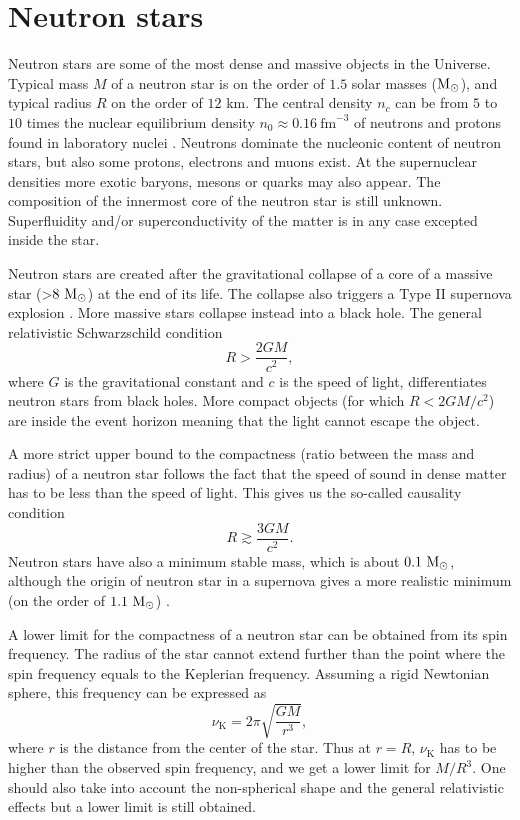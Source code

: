 \documentclass{wihuri}
\def\be{\begin{equation}}
\def\ee{\end{equation}}
\def\msun{{\rm M_{\odot}}}
\begin{document}
\section{Neutron stars}


Neutron stars are some of the most dense and massive objects in the
Universe. Typical mass $M$ of a neutron star is on the order of $1.5$ solar masses ($\msun$), %
and typical radius $R$ on the order of $12$ km. The central density $n_{c}$ can be from $5$ to $10$ times the nuclear equilibrium density $n_{0} \approx 0.16 ~\mathrm{fm}^{-3}$ of neutrons and protons found in laboratory nuclei \cite{lattimer}. Neutrons dominate the nucleonic content of neutron stars, but also some protons, electrons and muons exist. At the supernuclear densities more exotic baryons, mesons or quarks may also appear. The composition of the innermost core of the neutron star is still unknown. Superfluidity and/or superconductivity of the matter %
is in any case excepted inside the star. 

 
Neutron stars are created after the gravitational collapse of a core of a
massive star (>$8~\msun$) at the end of its life. The collapse also triggers a Type II supernova explosion \cite{lattimer}. More massive stars collapse instead into a black hole. The general relativistic Schwarzschild condition 
\be \label{eq:schw_cond}
 R > \frac{2GM}{c^{2}},
\ee 
where $G$ is the gravitational constant and $c$ is the speed of light, %
differentiates neutron stars from black holes. More compact objects (for which $R < 2GM/c^{2}$) are inside the event horizon meaning that the light cannot escape the object.


A more strict upper bound to the compactness (ratio between the mass and radius) of a neutron star follows
the fact \cite{rhoades} %
that the speed of sound in dense matter has to be less than the speed of light. This gives us the so-called causality condition
\be \label{eq:causality}
 R \gtrsim \frac{3GM}{c^{2}}.
\ee 
Neutron stars have also a minimum stable mass, which is about $0.1 ~\msun$, although the origin of neutron star in a supernova gives a more realistic minimum (on the order of $1.1 ~\msun$) \cite{lattimer2013}.

A lower limit for the compactness of a neutron star can be obtained from its spin frequency. The radius of the star cannot extend further than the point where the spin frequency equals to the Keplerian frequency. Assuming a rigid Newtonian sphere, this frequency can be expressed as
\be \label{eq:keplerian}
\nu_{\mathrm{K}} = 2 \pi \sqrt{\frac{GM}{r^{3}}},
\ee 
where $r$ is the distance from the center of the star. Thus at $r=R$, $\nu_{\mathrm{K}}$ has to be higher than the observed spin frequency, and we get a lower limit for $M/R^{3}$. One should also take into account the non-spherical shape and the general relativistic effects but a lower limit is still obtained.
\end{document}
